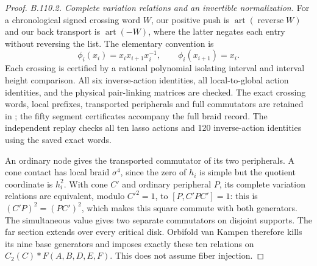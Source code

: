\begin{proof}
\emph{B.110.2. Complete variation relations and an invertible normalization.}
For a chronological signed crossing word $W$, our positive push is
$\operatorname{art}(\operatorname{reverse}W)$ and our back transport
is $\operatorname{art}(-W)$, where the latter negates each entry
without reversing the list. The elementary convention is
\[
 \phi_i(x_i)=x_ix_{i+1}x_i^{-1},\qquad
 \phi_i(x_{i+1})=x_i.
\]
Each crossing is certified by a rational polynomial isolating interval
and interval height comparison. All six inverse-action identities,
all local-to-global action identities, and the physical pair-linking
matrices are checked. The exact crossing words, local prefixes,
transported peripherals and full commutators are retained in
;
the fifty segment certificates accompany the full braid record.
The independent replay checks all ten lasso actions and 120
inverse-action identities using the saved exact words.

An ordinary node gives the transported commutator of its two
peripherals. A cone contact has local braid $\sigma^4$, since the
zero of $h_i$ is simple but the quotient coordinate is $h_i^2$.
With cone $C'$ and ordinary peripheral $P$, its complete variation
relations are equivalent, modulo $C'^2=1$, to
$[P,C'PC']=1$: this is $(C'P)^2=(PC')^2$, which makes this square
commute with both generators. The simultaneous value gives two
separate commutators on disjoint supports. The far section extends
over every critical disk. Orbifold van Kampen therefore kills
its nine base generators and imposes exactly these ten relations
on $C_2(C)*F(A,B,D,E,F)$. This does not assume fiber injection.


\end{proof}
